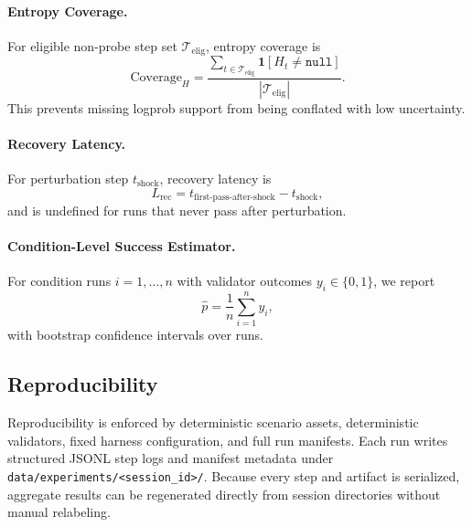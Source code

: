 \paragraph{Entropy Coverage.}
For eligible non-probe step set \(\mathcal{T}_{\text{elig}}\), entropy coverage is
\[
\mathrm{Coverage}_H =
\frac{\sum_{t \in \mathcal{T}_{\text{elig}}}\mathbf{1}[H_t \neq \texttt{null}]}
{|\mathcal{T}_{\text{elig}}|}.
\]
This prevents missing logprob support from being conflated with low uncertainty.

\paragraph{Recovery Latency.}
For perturbation step \(t_{\text{shock}}\), recovery latency is
\[
L_{\text{rec}} = t_{\text{first-pass-after-shock}} - t_{\text{shock}},
\]
and is undefined for runs that never pass after perturbation.

\paragraph{Condition-Level Success Estimator.}
For condition runs \(i=1,\dots,n\) with validator outcomes \(y_i \in \{0,1\}\), we report
\[
\hat{p} = \frac{1}{n}\sum_{i=1}^{n} y_i,
\]
with bootstrap confidence intervals over runs.

\subsection{Reproducibility}
Reproducibility is enforced by deterministic scenario assets, deterministic validators, fixed harness configuration, and full run manifests. Each run writes structured JSONL step logs and manifest metadata under \texttt{data/experiments/<session\_id>/}. Because every step and artifact is serialized, aggregate results can be regenerated directly from session directories without manual relabeling.
